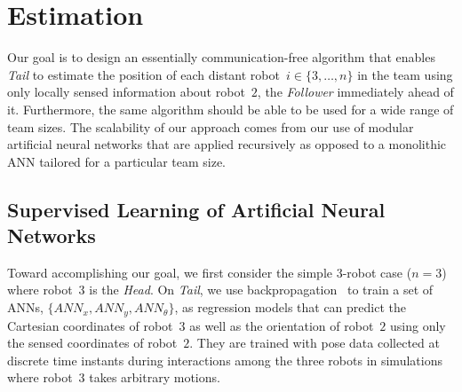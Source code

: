 \documentclass[letterpaper, 10 pt, conference]{ieeeconf}  %
\begin{document}
	\section{Estimation}
	\label{sec:estimation}
	
	Our goal is to design an essentially communication-free algorithm that
	enables \emph{Tail} to estimate the position of each distant robot~$i
	\in \{3,\dots,n\}$ in the team using only locally sensed information
	about robot~$2$, the \emph{Follower} immediately ahead of it.
	Furthermore, the same algorithm should be able to be used for a wide
	range of team sizes. The scalability of our approach comes from our use
	of modular artificial neural networks that are applied recursively as
	opposed to a monolithic ANN tailored for a particular team size.
	
	\subsection{Supervised Learning of Artificial Neural Networks}
	\label{sec:supervisedlearning}
	
	Toward accomplishing our goal, we first consider the simple 3-robot case
	($n=3$) where robot~3 is the \emph{Head}. On \emph{Tail}, we use
	backpropagation~\cite{B06} to train a set of ANNs, $\{ANN_{x}, ANN_{y},
	ANN_{\theta}\}$, as regression models that can predict the Cartesian
	coordinates of robot~$3$ as well as the orientation of robot~$2$ using
	only the sensed coordinates of robot~$2$. They are trained with pose
	data collected at discrete time instants during interactions among the
	three robots in simulations where robot~$3$ takes arbitrary motions.
	
\end{document}
